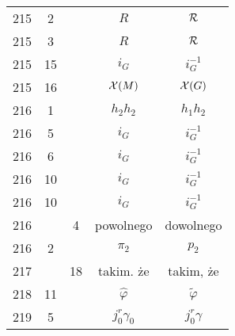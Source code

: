 \documentclass[a4paper,11pt]{article}
\begin{document}
\begin{center}
\begin{tabular}{|c|c|c|c|c|}
    215 &  2 & & $R$ & $\mathcal{R}$ \\
    215 &  3 & & $R$ & $\mathcal{R}$ \\
    215 & 15 & & $i_{ G }$ & $i_{ G }^{ -1 }$ \\
    215 & 16 & & $\mathcal{X}( M )$ & $\mathcal{X}( G )$ \\
    216 &  1 & & $h_{ 2 } h_{ 2 }$ & $h_{ 1 } h_{ 2 }$ \\
    216 &  5 & & $i_{ G }$ & $i^{ -1 }_{ G }$ \\
    216 &  6 & & $i_{ G }$ & $i^{ -1 }_{ G }$ \\
    216 & 10 & & $i_{ G }$ & $i^{ -1 }_{ G }$ \\
    216 & 10 & & $i_{ G }$ & $i^{ -1 }_{ G }$ \\
    216 & &  4 & powolnego & dowolnego \\
    216 &  2 & & $\pi_{ 2 }$ & $p_{ 2 }$ \\
    217 & & 18 & takim. że & takim, że \\
    218 & 11 & & $\widehat{ \varphi }$ & $\widetilde{ \varphi }$ \\
    219 &  5 & & $j^{ r }_{ 0 } \gamma_{ 0 }$ & $j^{ r }_{ 0 } \gamma$ \\
    \hline
  \end{tabular}






\end{center}
\end{document}
